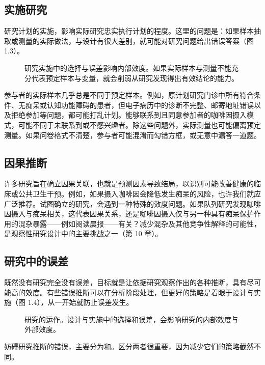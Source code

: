 \subsection{实施研究}
研究计划的实施，影响实际研究忠实执行计划的程度。这里的问题是：如果样本抽取或测量的实际做法，与设计有很大差别，就可能对研究问题给出错误答案（图 1.3）。
\par
\begin{figure}[htbp]\centering\choneimplementationflow
\caption{研究实施中的选择与误差影响内部效度。如果实际样本与测量不能充分代表预定样本与变量，就会削弱从研究发现得出有效结论的能力。}\label{fig:01_03}\end{figure}\par
参与者的实际样本几乎总是不同于预定样本。例如，原计划研究门诊中所有符合条件、无痴呆或认知功能障碍的患者，但电子病历中的诊断不完整、邮寄地址错误以及拒绝参加等问题，都可能打乱计划。能够联系到且同意参加者的咖啡因摄入模式，可能不同于未联系到或不感兴趣者。除这些问题外，实际测量也可能偏离预定测量。如果问卷格式不清楚，参与者可能混淆而勾错方框，或无意中漏答一道题。

\subsection{因果推断}
许多研究旨在确立因果关联，也就是预测因素导致结局，以识别可能改善健康的临床或公共卫生干预。例如，如果摄入咖啡因会降低发生痴呆的风险，也许我们就应广泛推荐。试图确立的研究，会遇到一种特殊的效度问题。如果队列研究发现咖啡因摄入与痴呆相关，这代表因果关系，还是咖啡因摄入仅与另一种具有痴呆保护作用的混杂暴露——例如阅读晨报——有关？减少混杂及其他竞争性解释的可能性，是观察性研究设计中的主要挑战之一（第 10 章）。

\subsection{研究中的误差}
既然没有研究完全没有误差，目标就是让依据研究观察作出的各种推断，具有尽可能高的效度。有些错误推断可以在分析阶段处理，但更好的策略是着眼于设计与实施（图 1.4），从一开始就防止误差发生。

\par
\begin{figure}[p]\centering\chonefullflow
\caption{研究的运作。设计与实施中的选择和误差，会影响研究的内部效度与外部效度。}\label{fig:01_04}\end{figure}\par
妨碍研究推断的错误，主要分为和。区分两者很重要，因为减少它们的策略截然不同。


